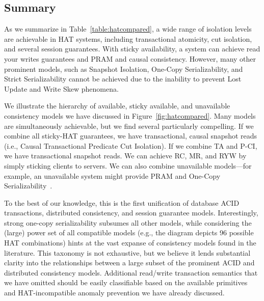 \subsection{Summary}
\label{sec:hat-summary}

As we summarize in Table~\ref{table:hatcompared}, a wide range of
isolation levels are achievable in HAT systems, including
transactional atomicity, cut isolation, and several session
guarantees. With sticky availability, a system can achieve read your
writes guarantees and PRAM and causal consistency. However, many other
prominent models, such as Snapshot Isolation, One-Copy
Serializability, and Strict Serializability cannot be achieved due to
the inability to prevent Lost Update and Write Skew phenomena.

We illustrate the hierarchy of available, sticky available, and
unavailable consistency models we have discussed in
Figure~\ref{fig:hatcompared}. Many models are simultaneously
achievable, but we find several particularly compelling. If we combine
all sticky-HAT guarantees, we have transactional, causal snapshot
reads (i.e., Causal Transactional Predicate Cut Isolation). If we
combine TA and P-CI, we have transactional snapshot reads. We can
achieve RC, MR, and RYW by simply sticking clients to servers. We can
also combine unavailable models---for example, an unavailable system
might provide PRAM and One-Copy
Serializability~\cite{daudjee-session}.

To the best of our knowledge, this is the first unification of
database ACID transactions, distributed consistency, and session
guarantee models. Interestingly, strong one-copy serializability
subsumes all other models, while considering the (large) power set of
all compatible models (e.g., the diagram depicts 96 possible HAT
combinations) hints at the vast expanse of consistency models found in
the literature. This taxonomy is not exhaustive, but we believe it
lends substantial clarity into the relationships between a large
subset of the prominent ACID and distributed consistency
models. Additional read/write transaction semantics that we have
omitted should be easily classifiable based on the available
primitives and HAT-incompatible anomaly prevention we have already
discussed.

 \newcommand{\lostupdate}{$^\dagger$}
 \newcommand{\rwskew}{$^\ddagger$}
 \newcommand{\linearizable}{$^\oplus$}

